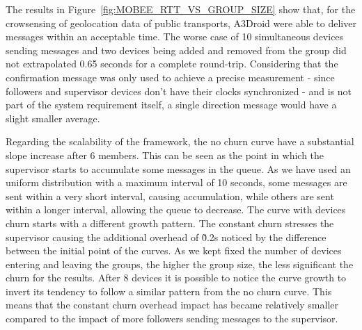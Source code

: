 The results in Figure~\ref{fig:MOBEE_RTT_VS_GROUP_SIZE} show that, for the crowsensing of geolocation data of public transports, A3Droid were able to deliver messages within an acceptable time. The worse case of 10 simultaneous devices sending messages and two devices being added and removed from the group did not extrapolated 0.65 seconds for a complete round-trip. Considering that the confirmation message was only used to achieve a precise measurement - since followers and supervisor devices don't have their clocks synchronized - and is not part of the system requirement itself, a single direction message would have a slight smaller average.

Regarding the scalability of the framework, the no churn curve have a substantial slope increase after 6 members. This can be seen as the point in which the supervisor starts to accumulate some messages in the queue. As we have used an uniform distribution with a maximum interval of 10 seconds, some messages are sent within a very short interval, causing accumulation, while others are sent within a longer interval, allowing the queue to decrease. The curve with devices churn starts with a different growth pattern. The constant churn stresses the supervisor causing the additional overhead of \~0.2s noticed by the difference between the initial point of the curves. As we kept fixed the number of devices entering and leaving the groups, the higher the group size, the less significant the churn for the results. After 8 devices it is possible to notice the curve growth to invert its tendency to follow a similar pattern from the no churn curve. This means that the constant churn overhead impact has became relatively smaller compared to the impact of more followers sending messages to the supervisor.